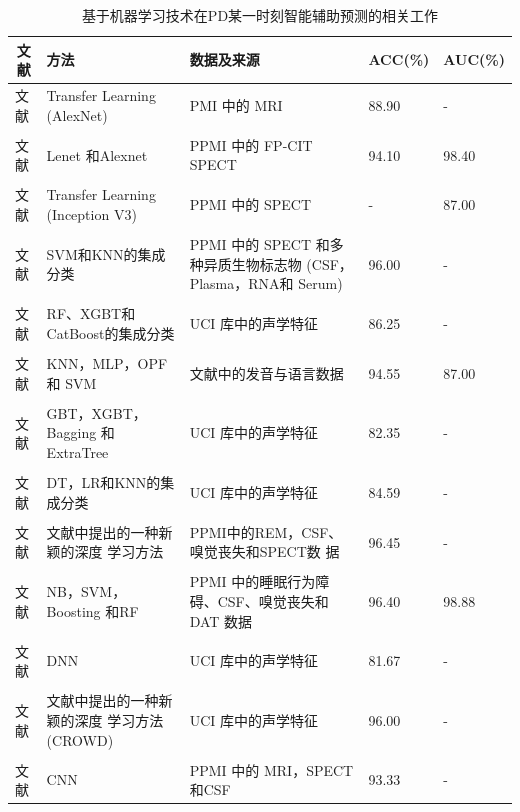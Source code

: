 \begin{table}[htbp]
\centering
\caption{基于机器学习技术在PD某一时刻智能辅助预测的相关工作}
\label{paper4MLpredictJt}
\small
\begin{tabular}{p{1.8cm}<{\centering}p{3.2cm}<{\centering}p{3.4cm}<{\centering}p{1.35cm}<{\centering}p{1.35cm}<{\centering}}
\hline 
\multicolumn{1}{c}{文献}  &方法    &数据及来源 &ACC(\%) &AUC(\%)  \\ \hline
文献\cite{sivaranjini2020deep}    &Transfer Learning (AlexNet)  &PMI 中的 MRI  &88.90  & -  \\ \\
文献\cite{martinez2018convolutional}   &Lenet 和Alexnet  &PPMI 中的 FP-CIT SPECT  &94.10  &98.40   \\ \\
文献\cite{kim2018artificial}    &Transfer Learning (Inception V3)  &PPMI 中的 SPECT  & -  &87.00   \\ \\
文献\cite{castillo2018robust}    &SVM和KNN的集成分类  &PPMI 中的 SPECT 和多种异质生物标志物
(CSF，Plasma，RNA和 Serum)  &96.00  & -   \\ \\
文献\cite{al2021feature}    &RF、XGBT和CatBoost的集成分类  &UCI 库中的声学特征  &86.25  & -   \\ \\
文献\cite{almeida2019detecting}   &KNN，MLP，OPF 和 SVM  &文献\cite{vaiciukynas2017detecting}中的发音与语言数据  &94.55  &87.00   \\ \\
文献\cite{nahar2021feature}    &GBT，XGBT，Bagging 和ExtraTree  &UCI 库中的声学特征  &82.35  & -   \\ \\
文献\cite{patra2019prediction}    &DT，LR和KNN的集成分类  &UCI 库中的声学特征  &84.59  & -   \\ \\
文献\cite{wang2020early}  &文献\cite{wang2020early}中提出的一种新颖的深度
学习方法  &PPMI中的REM，CSF、嗅觉丧失和SPECT数
据  &96.45  & -   \\ \\
文献\cite{prashanth2016high}     &NB，SVM，Boosting 和RF  &PPMI 中的睡眠行为障碍、CSF、嗅觉丧失和
DAT 数据  &96.40  &98.88   \\ \\
文献\cite{grover2018predicting}   &DNN  &UCI 库中的声学特征  &81.67  & -   \\  \\
文献\cite{masud2021crowd}   &文献\cite{masud2021crowd}中提出的一种新颖的深度
学习方法(CROWD)  &UCI 库中的声学特征  &96.00  & -   \\ \\
文献\cite{pahuja2022deep}    &CNN  &PPMI 中的 MRI，SPECT 和CSF  &93.33  & -   \\  \hline

\end{tabular}
\end{table}

